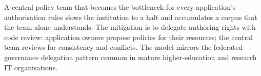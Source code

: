 \begin{pitfallbox}
\noindent A central policy team that becomes the bottleneck for every
application's authorisation rules slows the institution to a halt
and accumulates a corpus that the team alone understands. The
mitigation is to delegate authoring rights with code review:
application owners propose policies for their resources; the central
team reviews for consistency and conflicts. The model mirrors the
federated-governance delegation pattern common in mature
higher-education and research IT organisations.
\end{pitfallbox}
